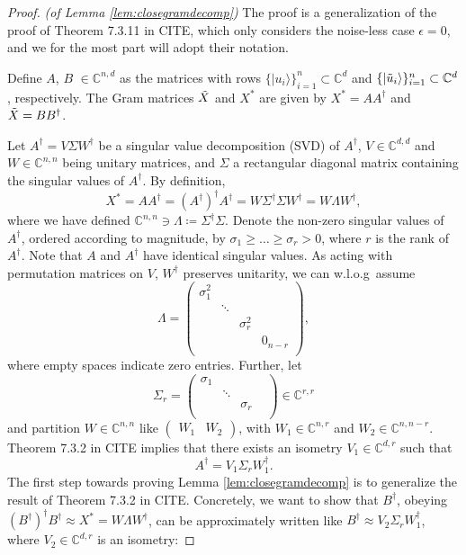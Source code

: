 \begin{proof}\emph{(of Lemma \ref{lem:closegramdecomp})}\hfill\break
The proof is a generalization of the proof of Theorem 7.3.11 in CITE, which only considers the noise-less case $\epsilon=0$, and we for the most part will adopt their notation. 

Define $A$, $B$ $\in\mathbb{C}^{n,d}$ as the matrices with rows $\{\vert u_i\rangle\}_{i=1}^n\subset\mathbb{C}^{d}$ and $\{\vert \Tilde{u}_i \rangle\}_{i=1}^n\subset\mathbb{C}^{d}$, respectively. The Gram matrices $\Tilde{X}$ and $X^*$ are given by $X^*=AA^{\dag}$ and $\Tilde{X}=BB^{\dag}$. 

Let $A^\dag = V\Sigma W^\dag$ be a singular value decomposition (SVD) of $A^\dag$, $V\in\mathbb{C}^{d,d}$ and $W\in\mathbb{C}^{n,n}$ being unitary matrices, and $\Sigma$ a rectangular diagonal matrix containing the singular values of $A^\dag$. By definition, 
\begin{equation*}
X^*=AA^\dag=(A^\dag)^{\dag} A^{\dag} = W\Sigma^\dag\Sigma W^\dag = W\Lambda W^\dag,
\end{equation*} where we have defined $\mathbb{C}^{n,n}\ni\Lambda\coloneqq\Sigma^\dag\Sigma$. Denote the non-zero singular values of $A^\dag$, ordered according to magnitude, by $\sigma_1 \geq \dots \geq \sigma_r > 0$, where $r$ is the rank of $A^\dag$. Note that $A$ and $A^{\dag}$ have identical singular values. As acting with permutation matrices on $V$, $W^{\dag}$ preserves unitarity, we can w.l.o.g\ assume
\begin{equation*}
\Lambda = 
\begin{pmatrix}
\sigma_1^2 & & & \\
& \ddots & & \\
& & \sigma_r^2 & \\
& & & 0_{n-r}\\
\end{pmatrix},
\end{equation*}
where empty spaces indicate zero entries.
Further, let
\begin{equation*}
\Sigma_r = 
\begin{pmatrix}
\sigma_1 & &\\
& \ddots & & \\
& & \sigma_r\\
\end{pmatrix}\in\mathbb{C}^{r,r}
\end{equation*} and partition $W\in\mathbb{C}^{n,n}$ like 
$\begin{pmatrix}
W_1 & W_2
\end{pmatrix}$, with $W_1\in\mathbb{C}^{n,r}$ and $W_2\in\mathbb{C}^{n,n-r}$. Theorem 7.3.2 in CITE implies that there exists an isometry $V_1\in\mathbb{C}^{d,r}$ such that 
\begin{equation*}
A^{\dag}=V_1\Sigma_r W_1^{\dag}.
\end{equation*}
The first step towards proving Lemma \ref{lem:closegramdecomp} is to generalize the result of Theorem 7.3.2 in CITE. Concretely, we want to show that $B^{\dag}$, obeying $(B^{\dag})^{\dag}B^{\dag}\approx X^* = W\Lambda W^{\dag}$, can be approximately written like $B^{\dag}\approx V_2\Sigma_rW_1^{\dag}$, where $V_2\in\mathbb{C}^{d,r}$ is an isometry:


\end{proof}
